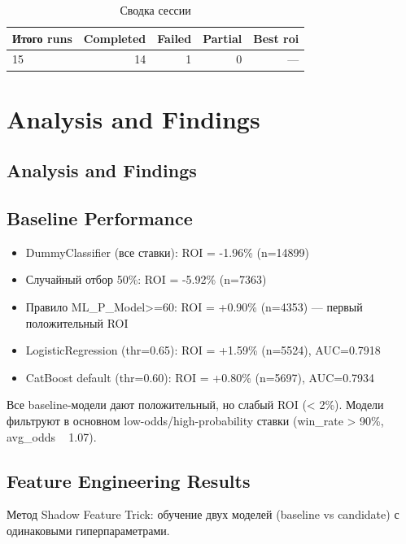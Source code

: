 \documentclass[12pt,a4paper]{article}
\begin{document}
\begin{table}[H]
\centering
\caption{Сводка сессии}
\begin{tabular}{lrrrr}
\toprule
Итого runs & Completed & Failed & Partial & Best roi \\
\midrule
15 & \textcolor{passcolor}{14}
    & \textcolor{failcolor}{1}
    & \textcolor{partialcolor}{0}
    & --- \\
\bottomrule
\end{tabular}
\end{table}







\section{Analysis and Findings}

\subsection{Analysis and Findings}

\subsection{Baseline Performance}
\begin{itemize}
  \item DummyClassifier (все ставки): ROI = -1.96\% (n=14899)
  \item Случайный отбор 50\%: ROI = -5.92\% (n=7363)
  \item Правило ML\_P\_Model>=60: ROI = +0.90\% (n=4353) — первый положительный ROI
  \item LogisticRegression (thr=0.65): ROI = +1.59\% (n=5524), AUC=0.7918
  \item CatBoost default (thr=0.60): ROI = +0.80\% (n=5697), AUC=0.7934
\end{itemize}

Все baseline-модели дают положительный, но слабый ROI (< 2\%). Модели фильтруют в основном low-odds/high-probability ставки (win\_rate > 90\%, avg\_odds ~ 1.07).

\subsection{Feature Engineering Results}
Метод Shadow Feature Trick: обучение двух моделей (baseline vs candidate) с одинаковыми гиперпараметрами.
\end{document}
